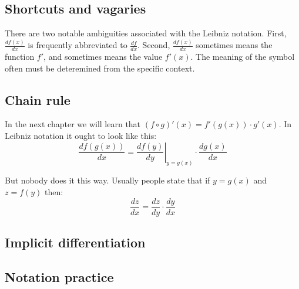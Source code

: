 \subsection{Shortcuts and vagaries}

There are two notable ambiguities associated with the Leibniz
notation. First, $\frac{df(x)}{dx}$ is frequently abbreviated to
$\frac{df}{dx}$. Second, $\frac{df(x)}{dx}$ sometimes means the
function $f'$, and sometimes means the value $f'(x)$. The meaning of
the symbol often must be deteremined from the specific context.

\subsection{Chain rule}

In the next chapter we will learn that $(f\circ g)'(x)=f'(g(x))\cdot g'(x)$.
In Leibniz notation it ought to look like this:
\[\frac{d f(g(x))}{dx} = \left. \frac{d f(y)}{dy} \right|_{y=g(x)} \cdot
  \frac{d g(x)}{dx}\]

But nobody does it this way. Usually people state that if $y=g(x)$ and
$z=f(y)$ then:
\[\frac{dz}{dx}=\frac{dz}{dy}\cdot \frac{dy}{dx}\]

\subsection{Implicit differentiation}

\subsection{Notation practice}


